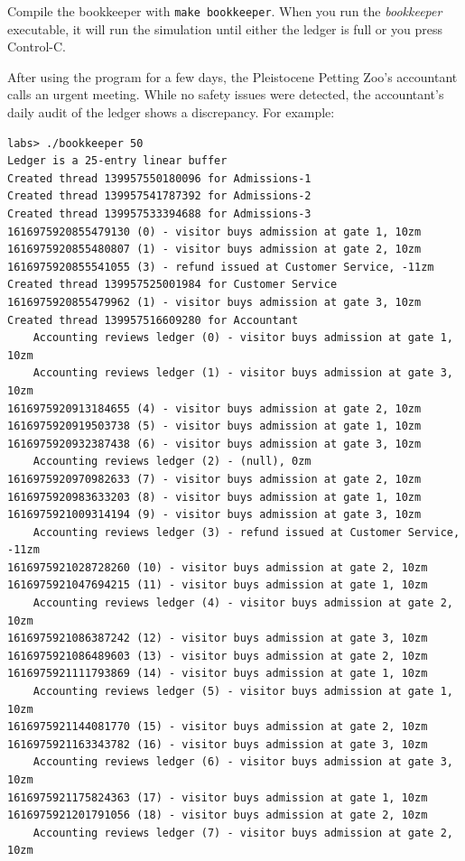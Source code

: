 Compile the bookkeeper with \texttt{make bookkeeper}. When you run the
\textit{bookkeeper} executable, it will run the simulation until either the
ledger is full or you press Control-C.

After using the program for a few days, the Pleistocene Petting Zoo's
accountant calls an urgent meeting. While no safety issues were detected, the
accountant's daily audit of the ledger shows a discrepancy. For example:

\begin{verbatim}
labs> ./bookkeeper 50
Ledger is a 25-entry linear buffer
Created thread 139957550180096 for Admissions-1
Created thread 139957541787392 for Admissions-2
Created thread 139957533394688 for Admissions-3
1616975920855479130 (0) - visitor buys admission at gate 1, 10zm
1616975920855480807 (1) - visitor buys admission at gate 2, 10zm
1616975920855541055 (3) - refund issued at Customer Service, -11zm
Created thread 139957525001984 for Customer Service
1616975920855479962 (1) - visitor buys admission at gate 3, 10zm
Created thread 139957516609280 for Accountant
	Accounting reviews ledger (0) - visitor buys admission at gate 1, 10zm
	Accounting reviews ledger (1) - visitor buys admission at gate 3, 10zm
1616975920913184655 (4) - visitor buys admission at gate 2, 10zm
1616975920919503738 (5) - visitor buys admission at gate 1, 10zm
1616975920932387438 (6) - visitor buys admission at gate 3, 10zm
	Accounting reviews ledger (2) - (null), 0zm
1616975920970982633 (7) - visitor buys admission at gate 2, 10zm
1616975920983633203 (8) - visitor buys admission at gate 1, 10zm
1616975921009314194 (9) - visitor buys admission at gate 3, 10zm
	Accounting reviews ledger (3) - refund issued at Customer Service, -11zm
1616975921028728260 (10) - visitor buys admission at gate 2, 10zm
1616975921047694215 (11) - visitor buys admission at gate 1, 10zm
	Accounting reviews ledger (4) - visitor buys admission at gate 2, 10zm
1616975921086387242 (12) - visitor buys admission at gate 3, 10zm
1616975921086489603 (13) - visitor buys admission at gate 2, 10zm
1616975921111793869 (14) - visitor buys admission at gate 1, 10zm
	Accounting reviews ledger (5) - visitor buys admission at gate 1, 10zm
1616975921144081770 (15) - visitor buys admission at gate 2, 10zm
1616975921163343782 (16) - visitor buys admission at gate 3, 10zm
	Accounting reviews ledger (6) - visitor buys admission at gate 3, 10zm
1616975921175824363 (17) - visitor buys admission at gate 1, 10zm
1616975921201791056 (18) - visitor buys admission at gate 2, 10zm
	Accounting reviews ledger (7) - visitor buys admission at gate 2, 10zm

\end{verbatim}
